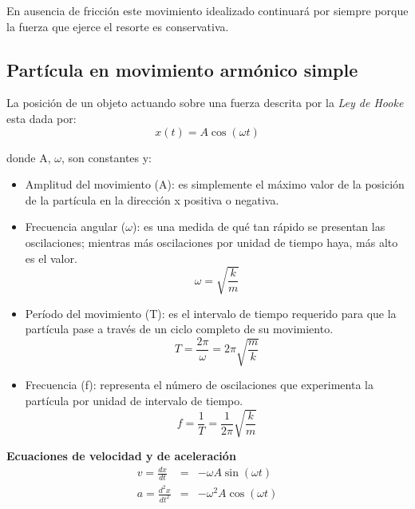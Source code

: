     \PN En ausencia de fricción este movimiento idealizado continuará por siempre porque la fuerza que ejerce el resorte
    es conservativa.

  \subsection{Partícula en movimiento armónico simple}
    \PN La posición de un objeto actuando sobre una fuerza descrita por la \textit{Ley de Hooke} esta dada por:
    \begin{equation}
      x(t) = A \cos (\omega t)
    \end{equation}

    \PN donde A, $\omega$, son constantes y:
    \begin{itemize}
      \item Amplitud del movimiento (A): es simplemente el máximo valor de la posición de la partícula en la dirección x
      positiva o negativa.
      \item Frecuencia angular ($\omega$): es una medida de qué tan rápido se presentan las oscilaciones;
      mientras más oscilaciones por unidad de tiempo haya, más alto es el valor.
      \begin{equation}
        \omega = \sqrt{\frac{k}{m}}
      \end{equation}
      \item Período del movimiento (T): es el intervalo de tiempo requerido para que la partícula pase a través de un
      ciclo completo de su movimiento.
      \begin{equation}
        T = \frac{2\pi}{\omega} = 2\pi \sqrt{\frac{m}{k}}
      \end{equation}
      \item Frecuencia (f): representa el número de oscilaciones que experimenta la partícula por unidad de intervalo de
      tiempo.
      \begin{equation}
        f = \frac{1}{T} = \frac{1}{2\pi} \sqrt{\frac{k}{m}}
      \end{equation}
    \end{itemize}

    \PN \textbf{Ecuaciones de velocidad y de aceleración}
    \begin{eqnarray*}
      v = \frac{dx}{dt} &=& - \omega A \sin (\omega t) \\
      a = \frac{d^{2}x}{dt^{2}} &=& - \omega^{2} A \cos (\omega t)
    \end{eqnarray*}

